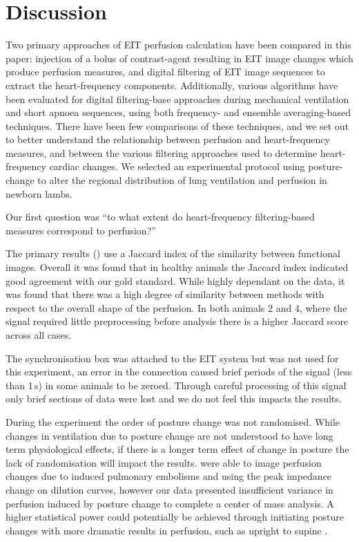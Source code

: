 \section{Discussion}                             %

Two primary approaches of EIT perfusion calculation
have been compared in this paper: injection
of a bolus of contrast-agent resulting 
in EIT image changes which produce perfusion measures, and
digital filtering of EIT image sequences to extract
the heart-frequency components.
Additionally, various algorithms have been evaluated
for digital filtering-base approaches during mechanical 
ventilation and short apnoea sequences, 
using both frequency- and ensemble averaging-based techniques.
There have been few comparisons of
these techniques, and 
we set out to better understand the relationship between
perfusion and heart-frequency measures, and between the various filtering
approaches used to determine heart-frequency cardiac changes.
We selected an experimental protocol using posture-change 
to alter the regional distribution of lung ventilation
and perfusion in newborn lambs.

Our first question was
``to what extent do heart-frequency filtering-based measures correspond to perfusion?''

The primary results () use a Jaccard index of the similarity
between functional images. Overall it was found that in healthy animals 
the Jaccard index indicated good agreement with our gold standard. While highly
dependant on the data, it was found that there was a high degree of similarity 
between methods with respect to
the overall shape of the perfusion. 
In both animals 2 and 4, where the signal required little preprocessing before analysis 
there is a higher Jaccard score across all cases.

The synchronisation box was attached to the EIT system but was not used for this experiment,
an error in the connection caused brief periods of the signal (less than 1\,s) in some animals to be zeroed.
Through careful processing of this signal only brief sections of data were lost and we do not feel this
impacts the results.

During the experiment the order of posture change was not randomised. 
While changes in ventilation due to posture change
are not understood to have long term physiological effects, if there is a longer term
effect of change in posture the lack of randomisation will impact the results. 
 were able to image perfusion changes due to induced 
pulmonary embolisms and using the peak impedance change on dilution curves,
however our data presented insufficient variance in perfusion induced by posture change to 
complete a center of mass analysis. A higher statistical power 
could potentially be achieved through initiating posture changes
with more dramatic results in perfusion, such as upright to supine \parencite{Nakazato2010}.

